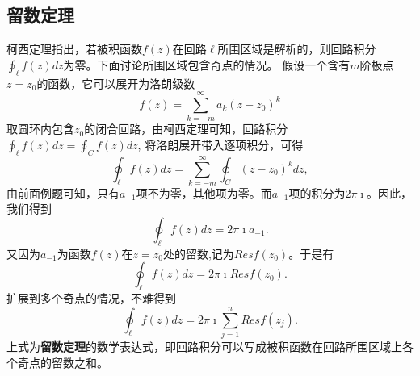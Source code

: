 \subsection{留数定理}
\label{subsec:residual_theorem}
柯西定理指出，若被积函数$f(z)$在回路$\ell$所围区域是解析的，则回路积分$\oint_\ell f(z) dz$为零。下面讨论所围区域包含奇点的情况。
假设一个含有$m$阶极点$z=z_0$的函数，它可以展开为洛朗级数
\[
  f(z) = \sum_{k = -m} ^{\infty} a_k (z - z_0)^k  
\]
取圆环内包含$z_0$的闭合回路，由柯西定理可知，回路积分$\oint_\ell f(z) dz = \oint_C f(z) dz$, 将洛朗展开带入逐项积分，可得
\[
\oint_\ell f(z) dz = \sum_{k = -m} ^{\infty} \oint_C  (z - z_0)^k dz,
\]
由前面例题可知，只有$a_{-1}$项不为零，其他项为零。而$a_{-1}$项的积分为$2\pi\imath$。因此，我们得到
\begin{equation}
    \oint_\ell f(z) dz = 2\pi \imath a_{-1} .
\end{equation}
又因为$a_{-1}$为函数$f(z)$在$z=z_0$处的留数,记为$Res f(z_0)$。于是有
\begin{equation}
    \oint_\ell f(z) dz = 2\pi \imath Res f(z_0) .
\end{equation}
扩展到多个奇点的情况，不难得到
\begin{equation}
    \oint_\ell f(z) dz = 2\pi \imath \sum_{j=1}^{n} Res f(z_j) .
\end{equation}
上式为\textbf{留数定理}的数学表达式，即回路积分可以写成被积函数在回路所围区域上各个奇点的留数之和。

